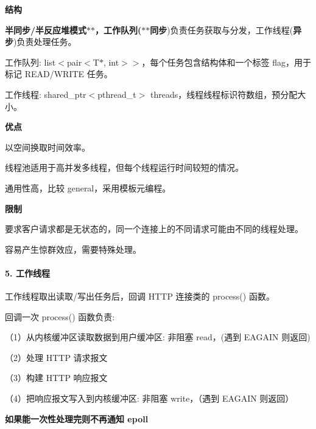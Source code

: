 \begin{DoxyItemize}
\item {\bfseries 结构}
\end{DoxyItemize}
\begin{DoxyEnumerate}
\item {\bfseries 半同步/半反应堆模式$\ast$$\ast$，工作队列($\ast$$\ast$同步})负责任务获取与分发，工作线程({\bfseries 异步})负责处理任务。
\item 工作队列\+: list$<$pair$<$\+T$\ast$, int$>$$>$，每个任务包含结构体和一个标签 flag，用于标记 R\+E\+A\+D/\+W\+R\+I\+TE 任务。
\item 工作线程\+: shared\+\_\+ptr$<$pthread\+\_\+t$>$ threads，线程线程标识符数组，预分配大小。
\end{DoxyEnumerate}
\begin{DoxyItemize}
\item {\bfseries 优点}
\end{DoxyItemize}
\begin{DoxyEnumerate}
\item 以空间换取时间效率。
\item 线程池适用于高并发多线程，但每个线程运行时间较短的情况。
\item 通用性高，比较 general，采用模板元编程。
\end{DoxyEnumerate}
\begin{DoxyItemize}
\item {\bfseries 限制}
\end{DoxyItemize}
\begin{DoxyEnumerate}
\item 要求客户请求都是无状态的，同一个连接上的不同请求可能由不同的线程处理。
\item 容易产生惊群效应，需要特殊处理。
\end{DoxyEnumerate}

\paragraph*{5. 工作线程}


\begin{DoxyEnumerate}
\item 工作线程取出读取/写出任务后，回调 H\+T\+TP 连接类的 process() 函数。
\item 回调一次 process() 函数负责\+:
\end{DoxyEnumerate}

（1）从内核缓冲区读取数据到用户缓冲区\+: 非阻塞 read，(遇到 E\+A\+G\+A\+IN 则返回)

（2）处理 H\+T\+TP 请求报文

（3）构建 H\+T\+TP 响应报文

（4）把响应报文写入到内核缓冲区\+: 非阻塞 write，（遇到 E\+A\+G\+A\+IN 则返回）


\begin{DoxyEnumerate}
\item {\bfseries 如果能一次性处理完则不再通知 epoll} 
\end{DoxyEnumerate}